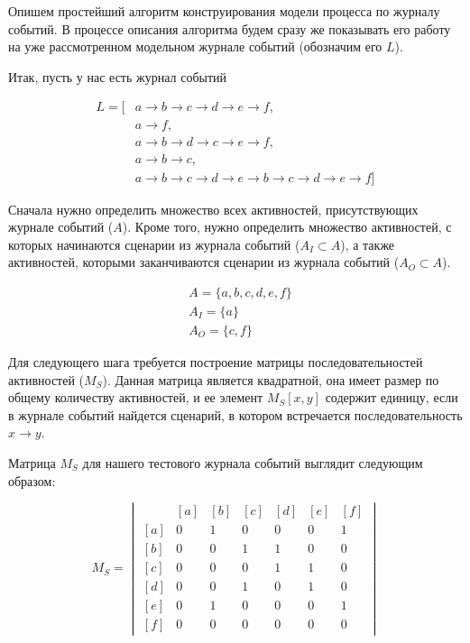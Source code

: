 \documentclass[
11pt,%
tightenlines,%
twoside,%
onecolumn,%
nofloats,%
nobibnotes,%
nofootinbib,%
superscriptaddress,%
noshowpacs,%
centertags]%
{revtex4}
\begin{document}
Опишем простейший алгоритм конструирования модели процесса по журналу событий.
В процессе описания алгоритма будем сразу же показывать его работу на уже рассмотренном модельном журнале событий (обозначим его $L$).

Итак, пусть у нас есть журнал событий

\begin{equation}
\begin{aligned}
L = [
&{a \rightarrow b \rightarrow c \rightarrow d \rightarrow e \rightarrow f},\\
&{a \rightarrow f},\\
&{a \rightarrow b \rightarrow d \rightarrow c \rightarrow e \rightarrow f},\\
&{a \rightarrow b \rightarrow c},\\
&{a \rightarrow b \rightarrow c \rightarrow d \rightarrow e \rightarrow b \rightarrow c \rightarrow d \rightarrow e \rightarrow f}
]
\end{aligned}
\end{equation}

Сначала нужно определить множество всех активностей, присутствующих журнале событий ($A$).
Кроме того, нужно определить множество активностей, с которых начинаются сценарии из журнала событий ($A_I \subset A$), а также активностей, которыми заканчиваются сценарии из журнала событий ($A_O \subset A$).

\begin{equation}
\begin{aligned}
&A = \{a, b, c, d, e, f\} \\
&A_I = \{a\} \\
&A_O = \{c, f\}
\end{aligned}
\end{equation}

Для следующего шага требуется построение матрицы последовательностей активностей ($M_S$).
Данная матрица является квадратной, она имеет размер по общему количеству активностей, и ее элемент $M_S[x, y]$ содержит единицу, если в журнале событий найдется сценарий, в котором встречается последовательность $x \rightarrow y$.

Матрица $M_S$ для нашего тестового журнала событий выглядит следующим образом:

\begin{equation}
M_S = \begin{vmatrix}
\ & [a] & [b] & [c] & [d] & [e] & [f] \\
[a] & 0 & 1 & 0 & 0 & 0 & 1 \\ 
[b] & 0 & 0 & 1 & 1 & 0 & 0 \\
[c] & 0 & 0 & 0 & 1 & 1 & 0 \\
[d] & 0 & 0 & 1 & 0 & 1 & 0 \\
[e] & 0 & 1 & 0 & 0 & 0 & 1 \\
[f] & 0 & 0 & 0 & 0 & 0 & 0
\end{vmatrix}
\end{equation}
\end{document}
